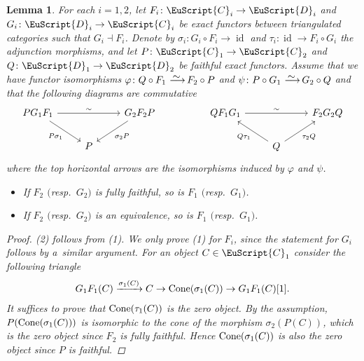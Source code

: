 \documentclass[10pt,a4paper]{amsart}
\newtheorem{lem}[dfn]{Lemma}
\numberwithin{equation}{section}
\newcommand{\id}{\operatorname{id}}
\newcommand{\scrC}{\EuScript{C}}
\newcommand{\scrD}{\EuScript{D}}
\newcommand{\simto}{\,\,\,\,\raisebox{4pt}{$\sim$}{\kern -1.1em \longrightarrow}\,}
\begin{document}
\begin{lem}\label{reduction lemma}
For each $i=1,2$, let $F_i\colon \scrC_i\to \scrD_i$ and $G_i\colon \scrD_i\to \scrC_i$ be exact functors between triangulated categories such that $G_i\dashv F_i$. Denote by $\sigma_i\colon G_i\circ F_i\to \id$ and $\tau_i\colon \id\to F_i\circ G_i$ the adjunction morphisms, and let $P\colon \scrC_1\to \scrC_2$ and $Q\colon \scrD_1\to\scrD_2$ be faithful exact functors. Assume that we have functor isomorphisms $\varphi\colon Q\circ F_1\simto F_2\circ P$ and $\psi\colon P\circ G_1\simto G_2\circ Q$ and that the following diagrams are commutative
\[
\begin{tikzcd}
PG_1F_1\arrow[rr, "\sim"]\arrow[rd, "P\sigma_1"']&&G_2F_2P\arrow[ld, "\sigma_2P"]&&
QF_1G_1\arrow[rr, "\sim"]&&F_2G_2Q\\
&P&&&&Q\arrow[lu, "Q\tau_1"]\arrow[ru, "\tau_2Q"']&
\end{tikzcd}
\]
where the top horizontal arrows are the isomorphisms induced by $\varphi$ and $\psi$.
\begin{itemize}\itemsep=0pt
\item[$1.$] If $F_2$ $($resp.\ $G_2)$ is fully faithful, so is $F_1$ $($resp.\ $G_1)$.
\item[$2.$] If $F_2$ $($resp.\ $G_2)$ is an equivalence, so is $F_1$ $($resp.\ $G_1)$.
\end{itemize}
\begin{proof}
(2) follows from (1). We only prove (1) for $F_i$, since the statement for $G_i$ follows by a~simi\-lar argument. For an object $C\in \scrC_1$ consider the following triangle
\begin{gather*}
 G_1F_1(C)\xrightarrow{\sigma_1(C)} C\to{\rm Cone}(\sigma_1(C))\to G_1F_1(C)[1].
\end{gather*}
It suffices to prove that ${\rm Cone}(\tau_1(C))$ is the zero object. By the assumption, $P({\rm Cone}(\sigma_1(C)))$ is isomorphic to the cone of the morphism $\sigma_2(P(C))$, which is the zero object since $F_2$ is fully faithful. Hence ${\rm Cone}(\sigma_1(C))$ is also the zero object since $P$ is faithful.
\end{proof}
\end{lem}
\end{document}
